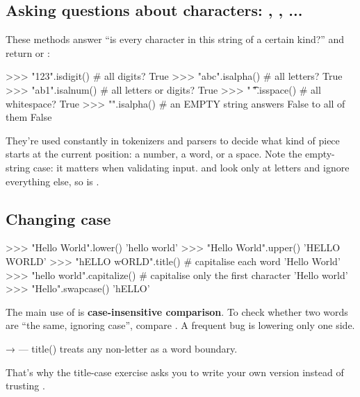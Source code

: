 \documentclass[10pt,a4paper]{article}
\begin{document}
\subsection{Asking questions about characters: , , ...}
These methods answer “is every character in this string of a certain kind?” and return  or :
\begin{txtcode}
>>> "123".isdigit()        # all digits?
True
>>> "abc".isalpha()        # all letters?
True
>>> "ab1".isalnum()        # all letters or digits?
True
>>> " \t\n".isspace()      # all whitespace?
True
>>> "".isalpha()           # an EMPTY string answers False to all of them
False
\end{txtcode}
They’re used constantly in tokenizers and parsers to decide what kind of piece starts at the current position: a number, a word, or a space. Note the empty-string case: it matters when validating input.
 and  look only at letters and ignore everything else, so  is .
\subsection{Changing case}
\begin{txtcode}
>>> "Hello World".lower()
'hello world'
>>> "Hello World".upper()
'HELLO WORLD'
>>> "hELLO wORLD".title()        # capitalise each word
'Hello World'
>>> "hello world".capitalize()   # capitalise only the first character
'Hello world'
>>> "Hello".swapcase()
'hELLO'
\end{txtcode}
The main use of  is \textbf{case-insensitive comparison}. To check whether two words are “the same, ignoring case”, compare . A frequent bug is lowering only one side.
\begin{tipbox}
 →  — title() treats any non-letter as a word boundary.
\end{tipbox}
That’s why the title-case exercise asks you to write your own version instead of trusting .
\end{document}
